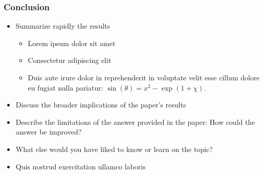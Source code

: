 \documentclass[11pt,xcolor={dvipsnames},hyperref={pdftex,pdfpagemode=UseNone,hidelinks,pdfdisplaydoctitle=true},usepdftitle=false]{beamer}
\begin{document}
\begin{frame}
\frametitle{Conclusion}
\begin{itemize}
\item Summarize rapidly the results
\begin{itemize}
\item Lorem ipsum dolor sit amet
\item Consectetur adipiscing elit
\item Duis aute irure dolor in reprehenderit in voluptate velit esse cillum dolore eu fugiat nulla pariatur: $\sin(\theta) = x^2 - \exp(1+\chi)$. 
\end{itemize}
\item Discuss the broader implications of the paper's results	
\item Describe the limitations of the answer provided in the paper: How could the answer be improved? 
\item What else would you have liked to know or learn on the topic?
\item Quis nostrud exercitation ullamco laboris
\end{itemize}	
\end{frame}
\end{document}
